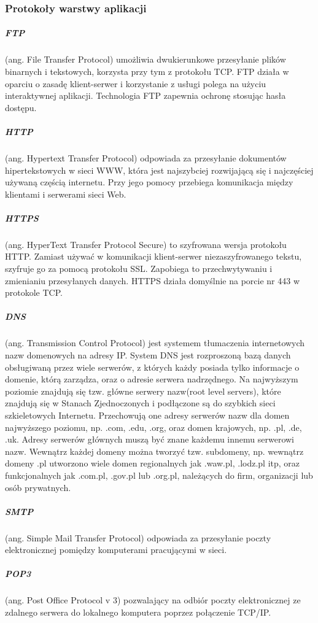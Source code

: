 \documentclass[a4paper,twoside]{report}
\begin{document}
\subsubsection{Protokoły warstwy aplikacji}

\medskip 
\subparagraph{FTP} (ang. File Transfer Protocol) umożliwia dwukierunkowe przesyłanie plików binarnych i tekstowych, korzysta przy tym z protokołu TCP. FTP działa w oparciu o zasadę klient-serwer i korzystanie z usługi polega na użyciu interaktywnej aplikacji. Technologia FTP zapewnia ochronę stosując hasła dostępu.

\subparagraph{HTTP} (ang. Hypertext Transfer Protocol) odpowiada  za  przesyłanie  dokumentów  hipertekstowych  w  sieci  WWW,  która  jest najszybciej rozwijającą się i najczęściej używaną częścią internetu. Przy jego pomocy przebiega komunikacja między klientami i serwerami sieci Web.

\subparagraph{HTTPS} (ang. HyperText Transfer Protocol Secure) to szyfrowana wersja protokołu HTTP. Zamiast używać w komunikacji klient-serwer niezaszyfrowanego tekstu, szyfruje go za pomocą protokołu SSL. Zapobiega to przechwytywaniu i zmienianiu przesyłanych danych.
HTTPS działa domyślnie na porcie nr 443 w protokole TCP.

\subparagraph{DNS} (ang. Transmission   Control   Protocol) jest systemem tłumaczenia internetowych nazw domenowych na adresy IP. 
System  DNS  jest  rozproszoną  bazą  danych obsługiwaną przez wiele serwerów, z których każdy posiada tylko informacje o domenie, którą zarządza, oraz o adresie serwera nadrzędnego. Na najwyższym poziomie znajdują się tzw. główne serwery nazw(root  level  servers),  które  znajdują  się  w  Stanach  Zjednoczonych  i  podłączone  są  do  szybkich  sieci szkieletowych Internetu. Przechowują one adresy serwerów nazw dla domen najwyższego poziomu, np. .com, .edu, .org, oraz domen krajowych, np. .pl, .de, .uk. Adresy serwerów głównych muszą być znane każdemu  innemu  serwerowi  nazw.  Wewnątrz  każdej  domeny  można  tworzyć  tzw.  subdomeny,  np. wewnątrz domeny .pl utworzono wiele domen regionalnych jak .waw.pl, .lodz.pl itp, oraz funkcjonalnych jak .com.pl, .gov.pl lub .org.pl, należących do firm, organizacji lub osób prywatnych. 

\subparagraph{SMTP} (ang. Simple Mail Transfer Protocol) odpowiada za przesyłanie poczty elektronicznej pomiędzy komputerami pracującymi w sieci.

\subparagraph{POP3} (ang. Post Office Protocol v 3) pozwalający na odbiór poczty elektronicznej ze zdalnego serwera do lokalnego komputera poprzez połączenie TCP/IP. 
\end{document}
